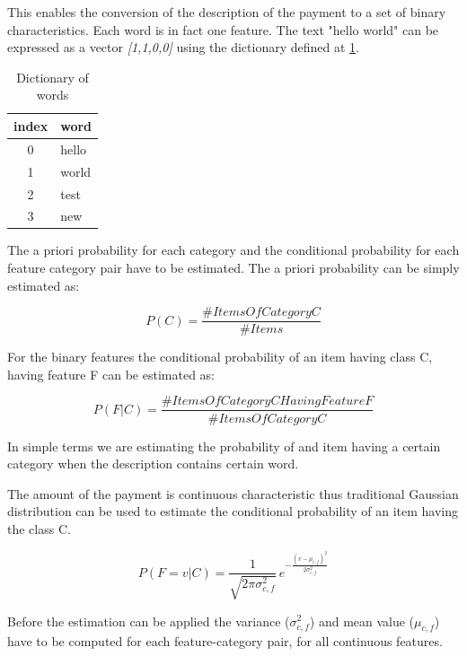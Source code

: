 This enables the conversion of the description of the payment to a set of binary characteristics. Each word is in fact one feature. The text "hello world" can be expressed as a vector \textit{[1,1,0,0]} using the dictionary defined at \ref{tab:word_dictionary}.

\begin{table}
\begin{center}
\begin{tabular}{|c|l|}
\hline
\textbf{index} & \textbf{word} \\
\hline
0 & hello \\
1 & world \\
2 & test \\
3 & new \\
\hline
\end{tabular}
\end{center}
\caption{Dictionary of words}
\label{tab:word_dictionary}
\end{table}

The a priori probability for each category and the conditional probability for each feature category pair have to be estimated. The a priori probability can be simply estimated as:

\begin{equation}
	P(C) = \frac{\# Items Of Category C}{\# Items}
\end{equation}

For the binary features the conditional probability of an item having class C, having feature F can be estimated as:

\begin{equation}
P(F \vert  C) = \frac{\# Items Of Category C Having Feature F}{\# Items Of Category C}	
\end{equation}

In simple terms we are estimating the probability of and item having a certain category when the description contains certain word.

The amount of the payment is continuous characteristic thus traditional Gaussian distribution can be used to estimate the conditional probability of an item having the class C.

\begin{equation}
	P(F = v \vert C) = \frac{1}{\sqrt{2\pi\sigma^2_{c,f}}}\,e^{ -\frac{(v-\mu_{c,f})^2}{2\sigma^2_{c,f}} }
\end{equation}

Before the estimation can be applied the variance ($\sigma^2_{c,f}$) and mean value ($\mu_{c,f}$) have to be computed for each feature-category pair, for all continuous features.

